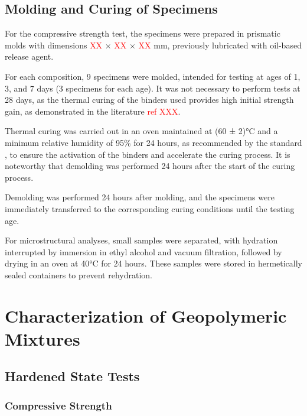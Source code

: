 \subsection{Molding and Curing of Specimens}
\label{subsec:molding_and_curing_specimens}

For the compressive strength test, the specimens were prepared in prismatic molds with dimensions \textcolor{red}{XX} × \textcolor{red}{XX} × \textcolor{red}{XX} mm, previously lubricated with oil-based release agent.

For each composition, 9 specimens were molded, intended for testing at ages of 1, 3, and 7 days (3 specimens for each age). It was not necessary to perform tests at 28 days, as the thermal curing of the binders used provides high initial strength gain, as demonstrated in the literature \textcolor{red}{ref XXX}.

Thermal curing was carried out in an oven maintained at (60 ± 2)°C and a minimum relative humidity of 95\% for 24 hours, as recommended by the standard \cite{ABNT_NBR_9479_2006}, to ensure the activation of the binders and accelerate the curing process.
It is noteworthy that demolding was performed 24 hours after the start of the curing process.

Demolding was performed 24 hours after molding, and the specimens were immediately transferred to the corresponding curing conditions until the testing age.

For microstructural analyses, small samples were separated, with hydration interrupted by immersion in ethyl alcohol and vacuum filtration, followed by drying in an oven at 40°C for 24 hours.
These samples were stored in hermetically sealed containers to prevent rehydration.

\section{Characterization of Geopolymeric Mixtures}
\label{sec:characterization_geopolymeric_mixtures}

\subsection{Hardened State Tests}
\label{subsec:hardened_state_tests}

\subsubsection{Compressive Strength}
\label{subsubsec:compressive_strength}


